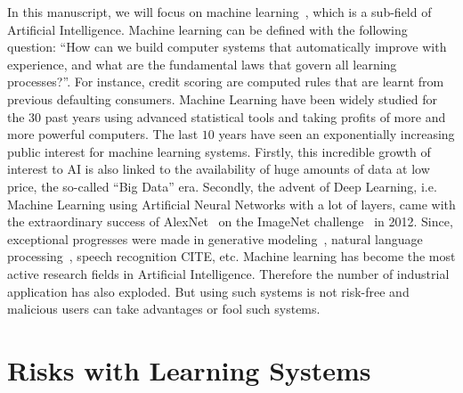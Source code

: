 In this manuscript, we will focus on  machine learning~\citep{friedman2001elements}, which is a sub-field of Artificial Intelligence. Machine learning can be defined with the following question: ``How can we build computer systems that automatically improve with experience, and what are the fundamental laws that govern  all learning processes?''. For instance, credit scoring are computed rules that are learnt from previous defaulting consumers. Machine Learning have been widely studied for the $30$ past years using advanced statistical tools and taking profits of more and more powerful computers.  The last $10$ years have seen an exponentially increasing public interest for machine learning systems. Firstly, this incredible growth of interest to AI is also linked to the availability of huge amounts of data at low price, the so-called ``Big Data'' era.  Secondly, the advent of Deep Learning, i.e. Machine Learning using Artificial Neural Networks with a lot of layers, came with the extraordinary success of AlexNet~\citep{krizhevsky2012imagenet} on the ImageNet challenge~\citep{imagenet_cvpr09} in 2012. Since, exceptional progresses were made in generative modeling~\citep{goodfellow2014generative}, natural language processing~\citep{vaswani2017attention}, speech recognition CITE, etc. Machine learning has become the most active research fields in Artificial Intelligence. Therefore the number of industrial application has also exploded. But using such systems is not risk-free and malicious users can take advantages or fool such systems.
\section{Risks with Learning Systems}

